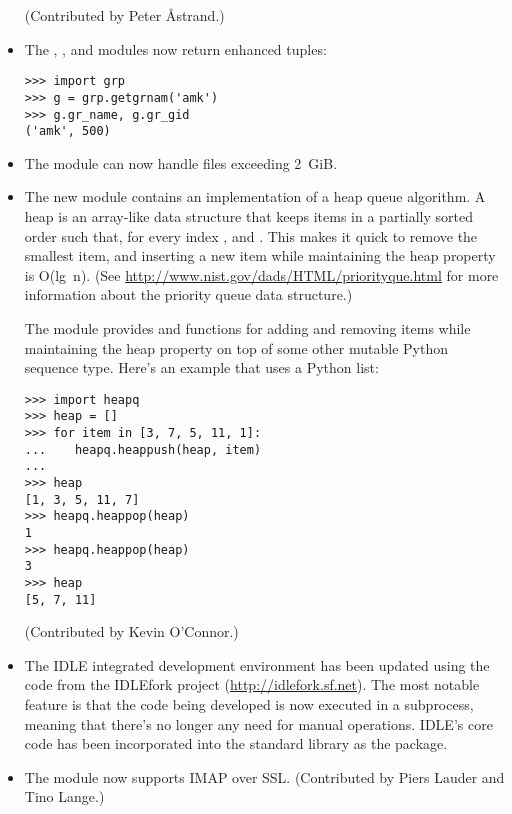 \documentclass{howto}
\begin{document}
\begin{itemize}
(Contributed by Peter \AA{strand}.)

\item The , , and  modules
now return enhanced tuples:

\begin{verbatim}
>>> import grp
>>> g = grp.getgrnam('amk')
>>> g.gr_name, g.gr_gid
('amk', 500)
\end{verbatim}

\item The  module can now handle files exceeding 2~GiB.  

\item The new  module contains an implementation of a
heap queue algorithm.  A heap is an array-like data structure that
keeps items in a partially sorted order such that, for every index
,  and
.  This makes it quick to
remove the smallest item, and inserting a new item while maintaining
the heap property is O(lg~n).  (See
\url{http://www.nist.gov/dads/HTML/priorityque.html} for more
information about the priority queue data structure.)

The  module provides  and
 functions for adding and removing items while
maintaining the heap property on top of some other mutable Python
sequence type.  Here's an example that uses a Python list:

\begin{verbatim}
>>> import heapq
>>> heap = []
>>> for item in [3, 7, 5, 11, 1]:
...    heapq.heappush(heap, item)
...
>>> heap
[1, 3, 5, 11, 7]
>>> heapq.heappop(heap)
1
>>> heapq.heappop(heap)
3
>>> heap
[5, 7, 11]
\end{verbatim}

(Contributed by Kevin O'Connor.)

\item The IDLE integrated development environment has been updated
using the code from the IDLEfork project
(\url{http://idlefork.sf.net}).  The most notable feature is that the
code being developed is now executed in a subprocess, meaning that
there's no longer any need for manual  operations.
IDLE's core code has been incorporated into the standard library as the
 package.

\item The  module now supports IMAP over SSL.
(Contributed by Piers Lauder and Tino Lange.)


\end{itemize}
\end{document}

